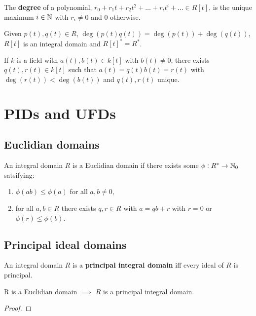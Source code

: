 \documentclass[../Year2.tex]{subfiles}
\begin{document}
\begin{definition}
    The \textbf{degree} of a polynomial, $r_0 + r_1t + r_2t^2 + \ldots + r_i t^i + \ldots \in R[t]$, is the unique maximum $i\in\mathbb{N}$ with $r_i\neq 0$ and $0$ otherwise.
\end{definition}

\begin{lemma}
    Given $p(t),q(t)\in R$, $\deg(p(t)q(t))=\deg(p(t))+\deg(q(t))$, $R[t]$ is an integral domain and $R[t]^* = R^*$.
\end{lemma}

\begin{theorem}
    If $k$ is a field with $a(t),b(t)\in k[t]$ with $b(t)\neq 0$, there exists $q(t),r(t)\in k[t]$ such that $a(t)=q(t)b(t)=r(t)$ with $\deg(r(t))<\deg(b(t))$ and $q(t),r(t)$ unique.
\end{theorem}

\section{PIDs and UFDs}

\subsection{Euclidian domains}

\begin{definition}
    An integral domain $R$ is a Euclidian domain if there exists some  $\phi:R^*\rightarrow\mathbb{N}_0$ satsifying: \begin{enumerate}
        \item $\phi(ab)\leq\phi(a)$ for all $a,b\neq 0$,
        \item for all $a,b\in R$ there exists $q,r\in R$ with $a=qb+r$ with $r=0$ or $\phi(r)\leq\phi(b)$.
    \end{enumerate}
\end{definition}

\subsection{Principal ideal domains}

\begin{definition}
    An integral domain $R$ is a \textbf{principal integral domain} iff every ideal of $R$ is principal.
\end{definition}

\begin{theorem}
    R is a Euclidian domain $\implies$ $R$ is a principal integral domain.
    \begin{proof}
        
    \end{proof}
\end{theorem}
\end{document}
